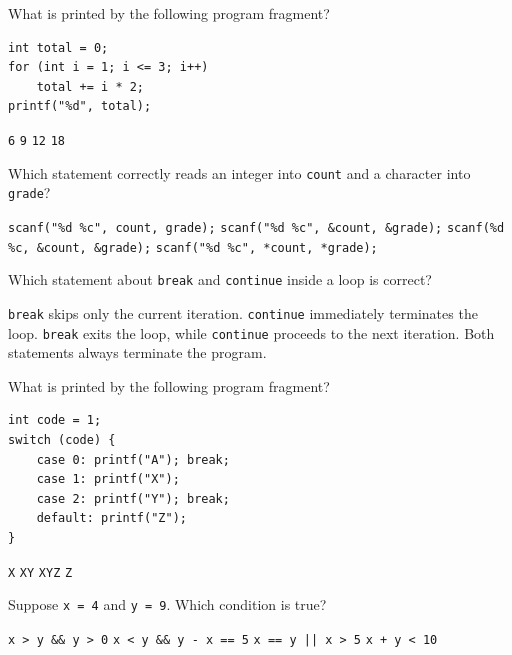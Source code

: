 \documentclass[12pt,a4paper,answers,addpoints]{exam}
\begin{document}
\begin{questions}
\question[2] What is printed by the following program fragment?
\begin{lstlisting}[style=examc]
int total = 0;
for (int i = 1; i <= 3; i++)
    total += i * 2;
printf("%d", total);
\end{lstlisting}
\begin{oneparchoices}
    \choice \texttt{6}
    \choice \texttt{9}
    \choice \texttt{12}
    \choice \texttt{18}
\end{oneparchoices}

\question[2] Which statement correctly reads an integer into \texttt{count} and a
character into \texttt{grade}?
\begin{choices}
    \choice \texttt{scanf("\%d \%c", count, grade);}
    \choice \texttt{scanf("\%d \%c", \&count, \&grade);}
    \choice \texttt{scanf(\%d \%c, \&count, \&grade);}
    \choice \texttt{scanf("\%d \%c", *count, *grade);}
\end{choices}

\question[2] Which statement about \texttt{break} and \texttt{continue} inside a
loop is correct?
\begin{choices}
    \choice \texttt{break} skips only the current iteration.
    \choice \texttt{continue} immediately terminates the loop.
    \choice \texttt{break} exits the loop, while \texttt{continue} proceeds
    to the next iteration.
    \choice Both statements always terminate the program.
\end{choices}

\question[2] What is printed by the following program fragment?
\begin{lstlisting}[style=examc]
int code = 1;
switch (code) {
    case 0: printf("A"); break;
    case 1: printf("X");
    case 2: printf("Y"); break;
    default: printf("Z");
}
\end{lstlisting}
\begin{oneparchoices}
    \choice \texttt{X}
    \choice \texttt{XY}
    \choice \texttt{XYZ}
    \choice \texttt{Z}
\end{oneparchoices}

\question[2] Suppose \texttt{x = 4} and \texttt{y = 9}. Which condition is true?
\begin{choices}
    \choice \texttt{x > y \&\& y > 0}
    \choice \texttt{x < y \&\& y - x == 5}
    \choice \texttt{x == y || x > 5}
    \choice \texttt{x + y < 10}
\end{choices}


\end{questions}
\end{document}
